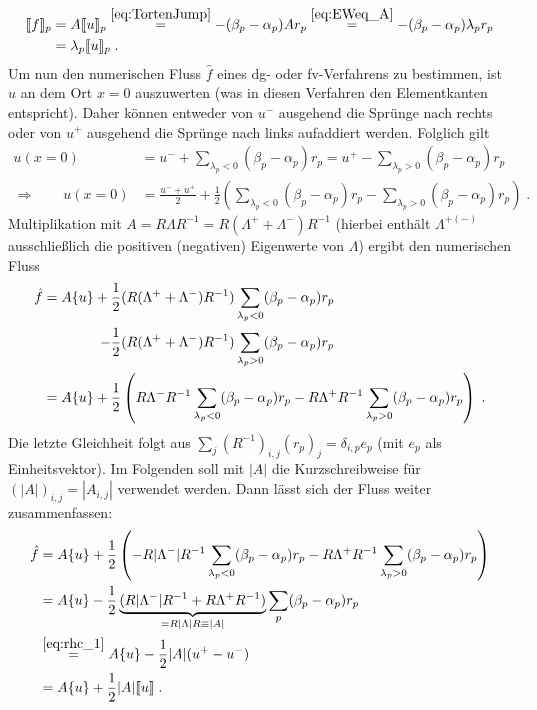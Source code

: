 \begin{equation}
  \begin{aligned}
    \llbracket f \rrbracket_p &= A\llbracket u \rrbracket_p \stackrel{\eqref{eq:TortenJump}}{=} -(\beta_p - \alpha_p) A r_p \stackrel{\eqref{eq:EWeq_A}}{=}  -(\beta_p - \alpha_p) \lambda_p r_p \\
    &= \lambda_p \llbracket u \rrbracket_p \; .
  \end{aligned}
\end{equation}
Um nun den numerischen Fluss $\hat{f}$ eines \ac{dg}- oder \ac{fv}-Verfahrens zu bestimmen, ist $u$ an dem Ort $x=0$ auszuwerten (was in diesen Verfahren den Elementkanten entspricht). Daher können entweder von $u^-$ ausgehend die Sprünge nach rechts oder von $u^+$ ausgehend die Sprünge nach links aufaddiert  werden. Folglich gilt
\begin{align}
  \label{eq:rhc_1}
  u(x=0) &= u^- + \sum_{\lambda_p < 0} (\beta_p - \alpha_p)r_p = u^+ - \sum_{\lambda_p > 0} (\beta_p - \alpha_p)r_p \\
  \Rightarrow \qquad u(x=0) &= \frac{u^- + u^+}{2} + \frac{1}{2}\left( \sum_{\lambda_p < 0} (\beta_p - \alpha_p)r_p - \sum_{\lambda_p > 0} (\beta_p - \alpha_p)r_p \right) \; .
\end{align}
Multiplikation mit $A=R\Lambda R^{-1} = R(\Lambda^+ + \Lambda^-)R^{-1}$ (hierbei enthält $\Lambda^{+(-)}$ ausschließlich die positiven (negativen) Eigenwerte von $\Lambda$) ergibt den numerischen Fluss
\begin{align*}
  \hat{f} = A \{ u \} + \frac{1}{2}& (R(\Lambda^+ + \Lambda^-)R^{-1}) \sum_{\lambda_p < 0} (\beta_p - \alpha_p)r_p \\
                     - \frac{1}{2}& (R(\Lambda^+ + \Lambda^-)R^{-1}) \sum_{\lambda_p > 0} (\beta_p - \alpha_p)r_p \\
         = A \{ u \} + \frac{1}{2}&\left( R\Lambda^-R^{-1} \sum_{\lambda_p < 0} (\beta_p - \alpha_p)r_p
                    - R\Lambda^+R^{-1} \sum_{\lambda_p > 0} (\beta_p - \alpha_p)r_p        \right) \; .
\end{align*}
Die letzte Gleichheit folgt aus $\sum_j (R^{-1})_{i,j} (r_p)_j = \delta_{i,p} e_p$ (mit $e_p$ als Einheitsvektor). Im Folgenden soll mit $|A|$ die Kurzschreibweise für $(|A|)_{i,j} = |A_{i,j}|$ verwendet werden. Dann lässt sich der Fluss weiter zusammenfassen:
\begin{align}
  \hat{f} &= A \{ u \} + \frac{1}{2} \left( -R|\Lambda^-|R^{-1} \sum_{\lambda_p < 0} (\beta_p - \alpha_p)r_p
              - R\Lambda^+R^{-1} \sum_{\lambda_p > 0} (\beta_p - \alpha_p)r_p        \right) \\
        &= A \{ u \} - \frac{1}{2} \underbrace{(R|\Lambda^-|R^{-1} + R\Lambda^+R^{-1})}_{=R|\Lambda|R \equiv |A|}  \sum_p(\beta_p - \alpha_p)r_p   \\
        &\stackrel{\eqref{eq:rhc_1}}{=} A \{ u \} - \frac{1}{2} |A| (u^+-u^-) \\
        &= A \{ u \} + \frac{1}{2} |A| \llbracket u \rrbracket \; .
\end{align}
